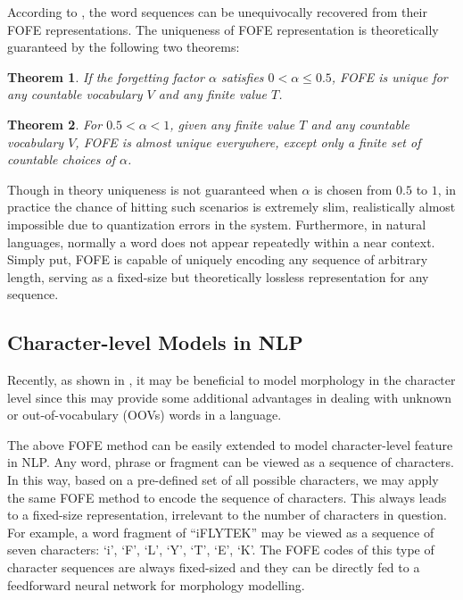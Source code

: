 \documentclass[11pt,a4paper]{article}
\newtheorem{theorem}{Theorem}
\begin{document}
According to \cite{zhang2015fixed}, the word sequences can be unequivocally recovered from their FOFE representations.
The uniqueness of FOFE representation is theoretically guaranteed by the following two theorems: 
\begin{theorem}
	If the forgetting factor $\alpha$ satisfies $0 < \alpha \leq 0.5$, FOFE is unique for any countable vocabulary $V$ and any finite value $T$.
\end{theorem}
\begin{theorem}
	For $0.5 < \alpha < 1 $, given any finite value $T$ and any countable vocabulary $V$,
	FOFE is almost unique everywhere, except only a finite set of countable choices of $\alpha$.
\end{theorem}
Though in theory uniqueness is not guaranteed when $\alpha$ is chosen from $0.5$ to $1$, 
in practice the chance of hitting such scenarios is extremely slim, realistically almost impossible due to quantization errors in the system. 
Furthermore, in natural languages, normally a word does not appear repeatedly within a near context. 
Simply put, FOFE is capable of uniquely encoding any sequence of arbitrary length, serving as a fixed-size but theoretically lossless representation for any sequence.


\subsection {Character-level Models in NLP}
\label{subsec_char_feature}

Recently, as shown in \cite{kim2015character}, it may be beneficial to model morphology in the character level since this may provide some additional advantages in dealing with unknown or out-of-vocabulary (OOVs) words in a language.

The above FOFE method can be easily extended to model character-level feature in NLP. Any word, phrase or fragment can be viewed as a sequence of characters. In this way, based on a pre-defined set of all possible characters, we may apply the same FOFE method to encode the sequence of characters. This always leads to a fixed-size representation, irrelevant to the number of characters in question. 
For example, a word fragment of ``iFLYTEK'' may be viewed as a 
sequence of seven characters: `i', `F', `L', `Y', `T', `E', `K'.
The FOFE codes of  this type of character sequences are always fixed-sized and they can be directly fed to a feedforward neural network for  morphology  modelling. 
\end{document}
